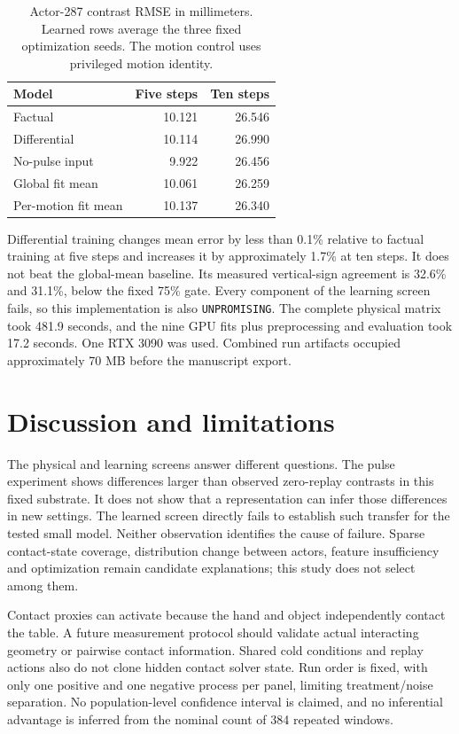 \documentclass[10pt]{article}
\begin{document}
\begin{table}[h]
\centering
\caption{Actor-287 contrast RMSE in millimeters. Learned rows average the three fixed
optimization seeds. The motion control uses privileged motion identity.}
\begin{tabular}{lrr}
\toprule
Model & Five steps & Ten steps\\
\midrule
Factual & 10.121 & 26.546\\
Differential & 10.114 & 26.990\\
No-pulse input & 9.922 & 26.456\\
Global fit mean & 10.061 & 26.259\\
Per-motion fit mean & 10.137 & 26.340\\
\bottomrule
\end{tabular}
\end{table}

Differential training changes mean error by less than 0.1\% relative to factual training
at five steps and increases it by approximately 1.7\% at ten steps. It does not beat
the global-mean baseline. Its measured vertical-sign agreement is 32.6\% and 31.1\%,
below the fixed 75\% gate. Every component of the learning screen fails, so this
implementation is also \texttt{UNPROMISING}. The complete physical matrix took
481.9 seconds, and the nine GPU fits plus preprocessing and evaluation took 17.2 seconds.
One RTX 3090 was used. Combined run artifacts occupied approximately 70 MB before
the manuscript export.

\section{Discussion and limitations}
The physical and learning screens answer different questions. The pulse experiment
shows differences larger than observed zero-replay contrasts in this fixed substrate.
It does not show that a representation can infer those differences in new settings.
The learned screen directly fails to establish such transfer for the tested small model.
Neither observation identifies the cause of failure. Sparse contact-state coverage,
distribution change between actors, feature insufficiency and optimization remain
candidate explanations; this study does not select among them.

Contact proxies can activate because the hand and object independently contact the
table. A future measurement protocol should validate actual interacting geometry or
pairwise contact information. Shared cold conditions and replay actions also do not
clone hidden contact solver state. Run order is fixed, with only one positive and one
negative process per panel, limiting treatment/noise separation. No population-level
confidence interval is claimed, and no inferential advantage is inferred from the
nominal count of 384 repeated windows.
\end{document}
